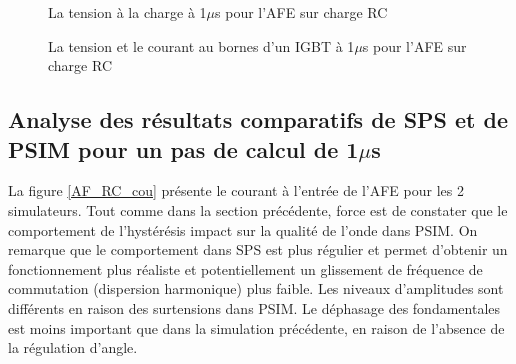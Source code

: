 \begin{figure}[htb]
\caption{La tension à la charge à 1$\mu$s pour l'AFE sur charge RC}
\label{AF_RC_ten}
\end{figure}



\begin{figure}[htb]
\caption{La tension et le courant au bornes d'un IGBT à 1$\mu$s pour l'AFE sur charge RC}
\label{AF_RC_igbt}
\end{figure}

\clearpage

\subsection{Analyse des résultats comparatifs de SPS et de PSIM pour un pas de calcul de 1$\mu$s}

La figure \ref{AF_RC_cou} présente le courant à l'entrée de l'AFE pour les 2 simulateurs. Tout comme dans la section précédente, force est de constater que le comportement de l'hystérésis impact sur la qualité de l'onde dans PSIM. On remarque que le comportement dans SPS est plus régulier et permet d'obtenir un fonctionnement plus réaliste et potentiellement un glissement de fréquence de commutation (dispersion harmonique) plus faible. Les niveaux d'amplitudes sont différents en raison des surtensions dans PSIM. Le déphasage des fondamentales est moins important que dans la simulation précédente, en raison de l'absence de la régulation d'angle. 

